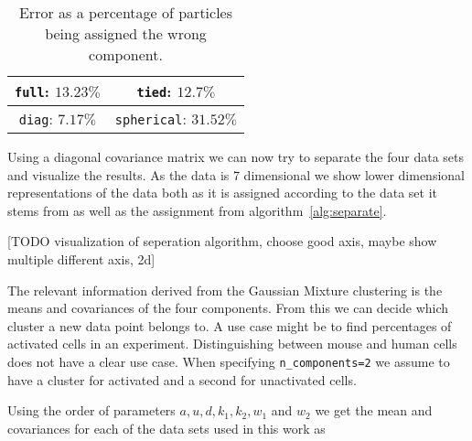 \begin{table}[h!]
	\centering
	\begin{tabular}{|c|c|}
		\hline
		\texttt{full}: $13.23\%$ & \texttt{tied}: $12.7\%$ \\
		\hline
		\texttt{diag}: $7.17\%$ & \texttt{spherical}: $31.52\%$ \\
		\hline
	\end{tabular}
	\label{tab:covariance_type_comparison}
	\caption{Error as a percentage of particles being assigned the wrong component.}
\end{table}

Using a diagonal covariance matrix we can now try to separate the four data sets and visualize the results. As the data is 7 dimensional we show lower dimensional representations of the data both as it is assigned according to the data set it stems from as well as the assignment from algorithm~\ref{alg:separate}.

[TODO visualization of seperation algorithm, choose good axis, maybe show multiple different axis, 2d]

The relevant information derived from the Gaussian Mixture clustering is the means and covariances of the four components. From this we can decide which cluster a new data point belongs to. A use case might be to find percentages of activated cells in an experiment. Distinguishing between mouse and human cells does not have a clear use case. When specifying \texttt{n\_components=2} we assume to have a cluster for activated and a second for unactivated cells.

Using the order of parameters $a, u, d, k_1, k_2, w_1$ and $w_2$ we get the mean and covariances for each of the data sets used in this work as 

